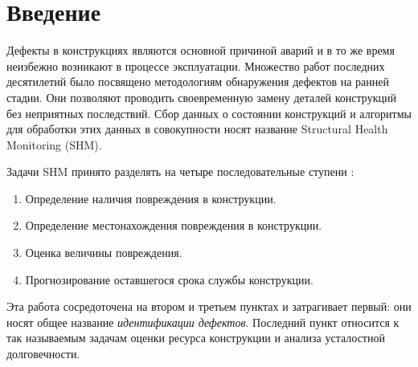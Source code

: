 \documentclass[a4paper,12pt]{article}
\theoremstyle{remark}
\begin{document}
	\tableofcontents
	
	\newpage
	\section{Введение}
	Дефекты в конструкциях являются основной причиной аварий и в то же время неизбежно возникают в процессе эксплуатации. Множество работ последних десятилетий было посвящено методологиям обнаружения дефектов на ранней стадии. Они позволяют проводить своевременную замену деталей конструкций без неприятных последствий. Сбор данных о состоянии конструкций и алгоритмы для обработки этих данных в совокупности носят название Structural Health Monitoring (SHM).
	
	Задачи SHM принято разделять на четыре последовательные ступени  \cite{review}:
	\begin{enumerate}[itemsep=0cm, topsep=0.2cm]
		\item Определение наличия повреждения в конструкции.
		\item Определение местонахождения повреждения в конструкции.
		\item Оценка величины повреждения.
		\item Прогнозирование оставшегося срока службы конструкции.
	\end{enumerate}
	
	Эта работа сосредоточена на втором и третьем пунктах и затрагивает первый: они носят общее название \textit{идентификации дефектов}. Последний пункт относится к так называемым задачам оценки ресурса конструкции и анализа усталостной долговечности.
	
\end{document}
